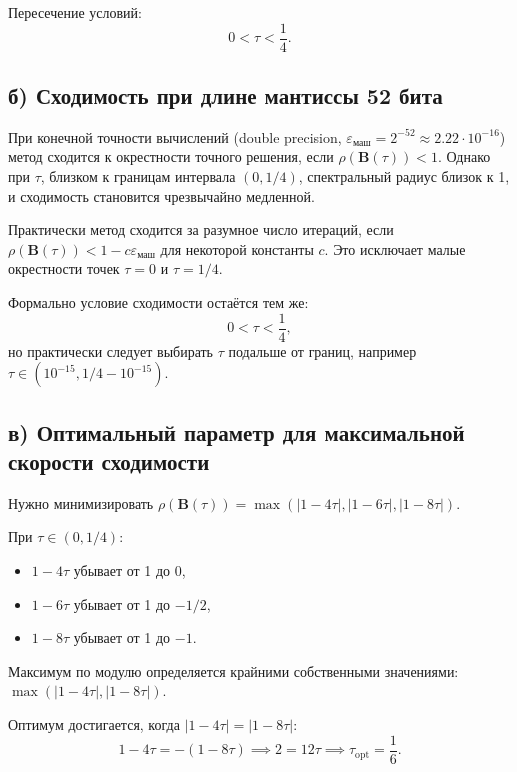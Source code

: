 \documentclass{article}
\begin{document}
Пересечение условий:
\begin{equation}
\boxed{0 < \tau < \frac{1}{4}.}
\end{equation}

\subsection*{б) Сходимость при длине мантиссы 52 бита}

При конечной точности вычислений (double precision, $\varepsilon_{\text{маш}} = 2^{-52} \approx 2.22 \cdot 10^{-16}$) метод сходится к окрестности точного решения, если $\rho(\mathbf{B}(\tau)) < 1$. Однако при $\tau$, близком к границам интервала $(0, 1/4)$, спектральный радиус близок к 1, и сходимость становится чрезвычайно медленной.

Практически метод сходится за разумное число итераций, если $\rho(\mathbf{B}(\tau)) < 1 - c\varepsilon_{\text{маш}}$ для некоторой константы $c$. Это исключает малые окрестности точек $\tau = 0$ и $\tau = 1/4$.

Формально условие сходимости остаётся тем же:
\begin{equation}
\boxed{0 < \tau < \frac{1}{4},}
\end{equation}
но практически следует выбирать $\tau$ подальше от границ, например $\tau \in (10^{-15}, 1/4 - 10^{-15})$.

\subsection*{в) Оптимальный параметр для максимальной скорости сходимости}

Нужно минимизировать $\rho(\mathbf{B}(\tau)) = \max(|1-4\tau|, |1-6\tau|, |1-8\tau|)$.

При $\tau \in (0, 1/4)$:
\begin{itemize}
\item $1 - 4\tau$ убывает от 1 до 0,
\item $1 - 6\tau$ убывает от 1 до $-1/2$,
\item $1 - 8\tau$ убывает от 1 до $-1$.
\end{itemize}

Максимум по модулю определяется крайними собственными значениями: $\max(|1-4\tau|, |1-8\tau|)$.

Оптимум достигается, когда $|1-4\tau| = |1-8\tau|$:
\begin{equation}
1 - 4\tau = -(1 - 8\tau) \implies 2 = 12\tau \implies \tau_{\text{opt}} = \frac{1}{6}.
\end{equation}
\end{document}
